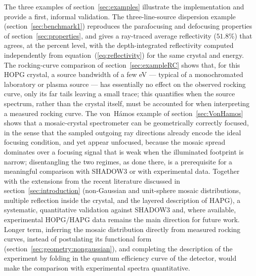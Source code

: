 \documentclass{iucr}
\begin{document}
The three examples of section~\ref{sec:examples} illustrate the implementation
and provide a first, informal validation. The three-line-source dispersion
example (section~\ref{sec:benchmark1}) reproduces the parafocusing and
defocusing properties of section~\ref{sec:properties}, and gives a ray-traced
average reflectivity ($51.8\%$) that agrees, at the percent level, with the
depth-integrated reflectivity computed independently from
equation~(\ref{eq:reflectivity}) for the same crystal and energy. The
rocking-curve comparison of section~\ref{sec:exampleRC} shows that, for this
HOPG crystal, a source bandwidth of a few eV --- typical of a monochromated
laboratory or plasma source --- has essentially no effect on the observed
rocking curve, only its far tails leaving a small trace; this quantifies when
the source spectrum, rather than the crystal itself, must be accounted for when
interpreting a measured rocking curve. The von~H\'amos example of
section~\ref{sec:VonHamos} shows that a mosaic-crystal spectrometer can be
geometrically correctly focused, in the sense that the sampled outgoing ray
directions already encode the ideal focusing condition, and yet appear
unfocused, because the mosaic spread dominates over a focusing signal that is
weak when the illuminated footprint is narrow; disentangling the two regimes,
as done there, is a prerequisite for a meaningful comparison with SHADOW3 or
with experimental data. Together with the extensions from the recent
literature discussed in section~\ref{sec:introduction} (non-Gaussian and
unit-sphere mosaic distributions, multiple reflection inside the crystal, and
the layered description of HAPG), a systematic, quantitative validation
against SHADOW3 and, where available, experimental HOPG/HAPG data remains the
main direction for future work. Longer term, inferring the mosaic distribution
directly from measured rocking curves, instead of postulating its functional
form (section~\ref{sec:geometry:nongaussian}), and completing the description
of the experiment by folding in the quantum efficiency curve of the detector,
would make the comparison with experimental spectra quantitative.


\newpage
{}

\end{document}

